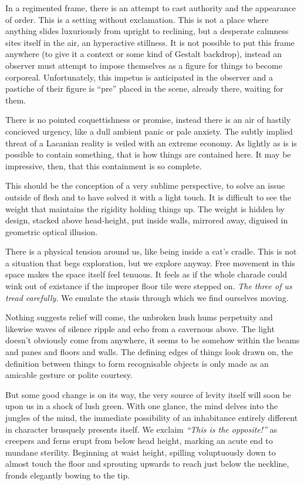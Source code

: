 \documentclass{book}
\begin{document}
In a regimented frame, there is an attempt to cast authority and the appearance
of order. This is a setting without exclamation. This is not a place where
anything slides luxuriously from upright to reclining, but a desperate calmness
sites itself in the air, an hyperactive stillness. It is not possible to put
this frame anywhere (to give it a context or some kind of Gestalt backdrop),
instead an observer must attempt to impose themselves as a figure for things to
become corporeal. Unfortunately, this impetus is anticipated in the observer
and a pastiche of their figure is ``pre'' placed in the scene, already there,
waiting for them.

There is no pointed coquettishness or promise, instead there is an air of
hastily concieved urgency, like a dull ambient panic or pale anxiety. The
subtly implied threat of a Lacanian reality is veiled with an extreme economy.
As lightly as is is possible to contain something, that is how things are
contained here. It may be impressive, then, that this containment is so
complete.

This should be the conception of a very sublime perspective, to solve an issue
outside of flesh and to have solved it with a light touch. It is difficult to
see the weight that maintains the rigidity holding things up. The weight is
hidden by design, stacked above head-height, put inside walls, mirrored away,
diguised in geometric optical illusion.

There is a physical tension around us, like being inside a cat's cradle. This
is not a situation that begs exploration, but we explore anyway. Free movement
in this space makes the space itself feel tenuous. It feels as if the whole
charade could wink out of existance if the improper floor tile were stepped on.
\emph{The three of us tread carefully.} We emulate the stasis through which we
find ourselves moving.

Nothing suggests relief will come, the unbroken hush hums perpetuity and
likewise waves of silence ripple and echo from a cavernous above. The light
doesn't obviously come from anywhere, it seems to be somehow within the beams
and panes and floors and walls. The defining edges of things look drawn on, the
definition between things to form recognisable objects is only made as an
amicable gesture or polite courtesy.

But some good change is on its way, the very source of levity itself will soon
be upon us in a shock of lush green. With one glance, the mind delves into the
jungles of the mind, the immediate possibility of an inhabitance entirely
different in character brusquely presents itself. We exclaim \emph{``This is
the opposite!''} as creepers and ferns erupt from below head height, marking an
acute end to mundane sterility. Beginning at waist height, spilling
voluptuously down to almost touch the floor and sprouting upwards to reach just
below the neckline, fronds elegantly bowing to the tip.
\end{document}

